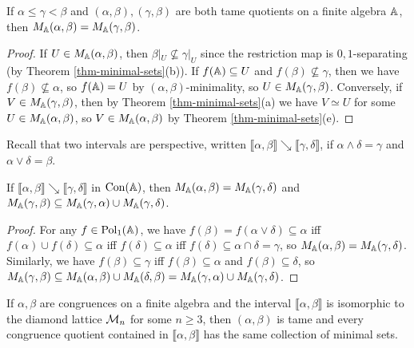 \begin{appendices}
\begin{prop} If $\alpha \le \gamma < \beta$ and $(\alpha,\beta), (\gamma,\beta)$ are both tame quotients on a finite algebra $\mathbb{A}$, then $M_{\mathbb{A}}(\alpha,\beta) = M_{\mathbb{A}}(\gamma,\beta)$.
\end{prop}
\begin{proof} If $U \in M_{\mathbb{A}}(\alpha,\beta)$, then $\beta|_U \not\subseteq \gamma|_U$ since the restriction map is $0,1$-separating (by Theorem \ref{thm-minimal-sets}(b)). If $f(\mathbb{A}) \subseteq U$ and $f(\beta) \not\subseteq \gamma$, then we have $f(\beta) \not\subseteq \alpha$, so $f(\mathbb{A}) = U$ by $(\alpha,\beta)$-minimality, so $U \in M_{\mathbb{A}}(\gamma,\beta)$. Conversely, if $V \in M_{\mathbb{A}}(\gamma,\beta)$, then by Theorem \ref{thm-minimal-sets}(a) we have $V \simeq U$ for some $U \in M_{\mathbb{A}}(\alpha,\beta)$, so $V \in M_{\mathbb{A}}(\alpha,\beta)$ by Theorem \ref{thm-minimal-sets}(e).
\end{proof}

Recall that two intervals are perspective, written $\llbracket \alpha, \beta \rrbracket \searrow \llbracket \gamma, \delta \rrbracket$, if $\alpha \wedge \delta = \gamma$ and $\alpha \vee \delta = \beta$.

\begin{prop} If $\llbracket \alpha, \beta \rrbracket \searrow \llbracket \gamma, \delta \rrbracket$ in $\operatorname{Con}(\mathbb{A})$, then $M_{\mathbb{A}}(\alpha,\beta) = M_{\mathbb{A}}(\gamma,\delta)$ and $M_{\mathbb{A}}(\gamma,\beta) \subseteq M_{\mathbb{A}}(\gamma,\alpha) \cup M_{\mathbb{A}}(\gamma, \delta)$.
\end{prop}
\begin{proof} For any $f \in \operatorname{Pol}_1(\mathbb{A})$, we have $f(\beta) = f(\alpha \vee \delta) \subseteq \alpha$ iff $f(\alpha) \cup f(\delta) \subseteq \alpha$ iff $f(\delta) \subseteq \alpha$ iff $f(\delta) \subseteq \alpha \cap \delta = \gamma$, so $M_{\mathbb{A}}(\alpha,\beta) = M_{\mathbb{A}}(\gamma,\delta)$. Similarly, we have $f(\beta) \subseteq \gamma$ iff $f(\beta) \subseteq \alpha$ and $f(\beta) \subseteq \delta$, so $M_{\mathbb{A}}(\gamma,\beta) \subseteq M_{\mathbb{A}}(\alpha,\beta) \cup M_{\mathbb{A}}(\delta,\beta) = M_{\mathbb{A}}(\gamma,\alpha) \cup M_{\mathbb{A}}(\gamma, \delta)$.
\end{proof}

\begin{cor} If $\alpha,\beta$ are congruences on a finite algebra and the interval $\llbracket \alpha, \beta \rrbracket$ is isomorphic to the diamond lattice $\mathcal{M}_n$ for some $n \ge 3$, then $(\alpha, \beta)$ is tame and every congruence quotient contained in $\llbracket \alpha, \beta \rrbracket$ has the same collection of minimal sets.
\end{cor}


\end{appendices}
